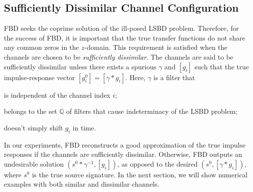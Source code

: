 \documentclass{article}
\theoremstyle{definition}
\def\vecc#1{[#1]}
\begin{document}
{\subsection{Sufficiently Dissimilar Channel Configuration}
FBD seeks the coprime 
solution of the ill-posed LSBD problem.
%
Therefore, 
for the success of FBD, 
it is important 
that the true transfer functions
do not share any common zeros in the $z$-domain.
%
This requirement is satisfied when the 
channels are chosen
to be
\emph{sufficiently dissimilar}.
%
The channels
are said to be sufficiently dissimilar 
unless there exists a spurious $\gamma$ 
and $\vecc{g_i}$ such that 
the true impulse-response vector $\vecc{g^0_{i}} = \vecc{\gamma\ast g_{i}}$.
%
Here, $\gamma$ is a 
filter that 
\begin{inparaenum}
\item is independent of the channel index $i$;
\item belongs to the set $\mathbb{Q}$ of filters that cause indeterminacy of the LSBD problem;
\item doesn't simply shift $g_i$ in time.
\end{inparaenum}
%
{In our experiments}, FBD reconstructs {a good approximation of} the true 
impulse responses
if the channels are sufficiently dissimilar.
%
Otherwise, FBD outputs
an 
undesirable solution
$(s^0\ast\gamma^{-1},\vecc{g_{i}})$,
as opposed to the desired $(s^0,\vecc{\gamma\ast g_{i}})$, where $s^0$ is the true 
source signature.
%
In the next section,
we will show numerical examples 
with both similar and dissimilar channels.








}
\end{document}
